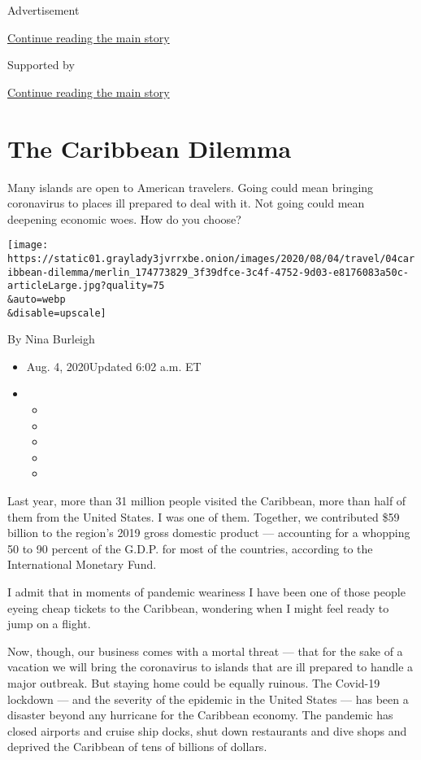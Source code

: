 Advertisement

\protect\hyperlink{after-top}{Continue reading the main story}

Supported by

\protect\hyperlink{after-sponsor}{Continue reading the main story}

\hypertarget{the-caribbean-dilemma}{%
\section{The Caribbean Dilemma}\label{the-caribbean-dilemma}}

Many islands are open to American travelers. Going could mean bringing
coronavirus to places ill prepared to deal with it. Not going could mean
deepening economic woes. How do you choose?

\texttt{[image: https://static01.graylady3jvrrxbe.onion/images/2020/08/04/travel/04caribbean-dilemma/merlin\_174773829\_3f39dfce-3c4f-4752-9d03-e8176083a50c-articleLarge.jpg?quality=75\\\&auto=webp\\\&disable=upscale]}

By Nina Burleigh

\begin{itemize}
\item
  Aug. 4, 2020Updated 6:02 a.m. ET
\item
  \begin{itemize}
  \item
  \item
  \item
  \item
  \item
  \end{itemize}
\end{itemize}

Last year, more than 31 million people visited the Caribbean, more than
half of them from the United States. I was one of them. Together, we
contributed \$59 billion to the region's 2019 gross domestic product ---
accounting for a whopping 50 to 90 percent of the G.D.P. for most of the
countries, according to the International Monetary Fund.

I admit that in moments of pandemic weariness I have been one of those
people eyeing cheap tickets to the Caribbean, wondering when I might
feel ready to jump on a flight.

Now, though, our business comes with a mortal threat --- that for the
sake of a vacation we will bring the coronavirus to islands that are ill
prepared to handle a major outbreak. But staying home could be equally
ruinous. The Covid-19 lockdown --- and the severity of the epidemic in
the United States --- has been a disaster beyond any hurricane for the
Caribbean economy. The pandemic has closed airports and cruise ship
docks, shut down restaurants and dive shops and deprived the Caribbean
of tens of billions of dollars.

